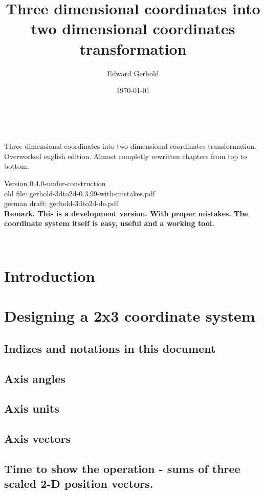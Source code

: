 \documentclass[a4paper]{article}
\begin{document}
\begin{center}
\title{Three dimensional coordinates into two dimensional coordinates transformation}\\
\author{Edward Gerhold}
Three dimensional coordinates into two dimensional coordinates transformation.\\
Overworked english edition. Almost completly rewritten chapters from top to bottom.
\date{\today}
\maketitle

Version 0.4.0-under-construction\\
old file: gerhold-3dto2d-0.3.99-with-mistakes.pdf\\
german draft: gerhold-3dto2d-de.pdf\\

\textbf{Remark. This is a development version. With proper mistakes. The coordinate system itself is easy, useful and a working tool.}

\end{center} 

\tableofcontents\\

\section{Introduction}

\section{Designing a 2x3 coordinate system}
\subsection{Indizes and notations in this document}
\subsection{Axis angles}
\subsection{Axis units}
\subsection{Axis vectors}
\subsection{Time to show the operation - sums of three scaled 2-D position vectors.}
\end{document}
